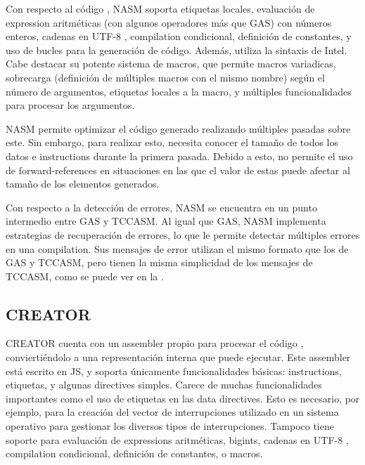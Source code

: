 Con respecto al código , NASM soporta etiquetas
locales, evaluación de \gls{expression} aritméticas (con algunos operadores más
que \gls{GAS}) con números enteros, cadenas en UTF-8 \parencite{UTF-8},
\gls{compilation} condicional, definición de constantes, y uso de bucles para la
generación de código. Además, utiliza la sintaxis de Intel. Cabe destacar su
potente sistema de \glspl{macro}, que permite \glspl{macro} variadicas,
sobrecarga (definición de múltiples \glspl{macro} con el mismo nombre) según el
número de argumentos, etiquetas locales a la \gls{macro}, y múltiples
funcionalidades para procesar los argumentos.

NASM permite optimizar el código generado realizando múltiples pasadas sobre
este. Sin embargo, para realizar esto, necesita conocer el tamaño de todos los
datos e \glspl{instruction} durante la primera pasada. Debido a esto, no permite
el uso de \glspl{forward-reference} en situaciones en las que el valor de estas
puede afectar al tamaño de los elementos generados. \parencite{NASM-manual}

Con respecto a la detección de errores, NASM se encuentra en un punto intermedio
entre \gls{GAS} y TCCASM. Al igual que \gls{GAS}, NASM implementa estrategias de
recuperación de errores, lo que le permite detectar múltiples errores en una
\gls{compilation}. Sus mensajes de error utilizan el mismo formato que los de
\gls{GAS} y TCCASM, pero tienen la misma simplicidad de los mensajes de TCCASM,
como se puede ver en la .


\subsection{CREATOR}

CREATOR \parencite{CREATOR} cuenta con un \gls{assembler} propio para procesar
el código , conviertiéndolo a una representación
interna que puede ejecutar. Este \gls{assembler} está escrito en \gls{JS}, y
soporta únicamente funcionalidades básicas: \glspl{instruction}, etiquetas,
y algunas \glspl{directive} simples. Carece de muchas funcionalidades importantes
como el uso de etiquetas en las \glspl{data directive}. Esto es necesario, por
ejemplo, para la creación del vector de interrupciones utilizado en un sistema
operativo para gestionar los diversos tipos de interrupciones. Tampoco tiene
soporte para evaluación de \glspl{expression} aritméticas, \glspl{bigint},
cadenas en UTF-8 \parencite{UTF-8}, \gls{compilation} condicional, definición de
constantes, o \glspl{macro}.

